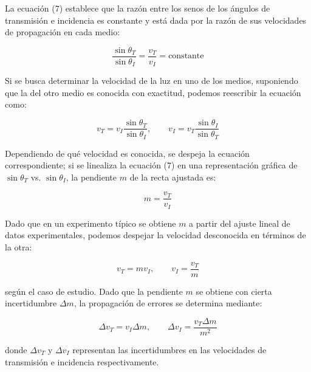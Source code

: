 \documentclass{article}
\theoremstyle{nonumberplain}
\begin{document}
La ecuación (7) establece que la razón entre los senos de los ángulos de transmisión e incidencia es constante y está dada por la razón de sus velocidades de propagación en cada medio:

\[
\frac{\sin{\theta_T}}{\sin{\theta_I}} = \frac{v_T}{v_I} = \text{constante}
\]

Si se busca determinar la velocidad de la luz en uno de los medios, suponiendo que la del otro medio es conocida con exactitud, podemos reescribir la ecuación como:

\[
v_T = v_I \frac{\sin{\theta_T}}{\sin{\theta_I}}, \quad \quad
v_I = v_T \frac{\sin{\theta_I}}{\sin{\theta_T}}
\]

Dependiendo de qué velocidad es conocida, se despeja la ecuación correspondiente; si se linealiza la ecuación (7) en una representación gráfica de \(\sin{\theta_T}\) vs. \(\sin{\theta_I}\), la pendiente \(m\) de la recta ajustada es:

\[
m = \frac{v_T}{v_I}
\]

Dado que en un experimento típico se obtiene \(m\) a partir del ajuste lineal de datos experimentales, podemos despejar la velocidad desconocida en términos de la otra:

\[
v_T = m v_I, \quad \quad
v_I = \frac{v_T}{m}
\]

según el caso de estudio. Dado que la pendiente \(m\) se obtiene con cierta incertidumbre \(\Delta m\), la propagación de errores se determina mediante:

\[
\Delta v_T = v_I \Delta m,  \quad \quad \Delta v_I = \frac{v_T \Delta m}{m^2}
\]

donde \(\Delta v_T\) y \(\Delta v_I\) representan las incertidumbres en las velocidades de transmisión e incidencia respectivamente. \\
\end{document}
